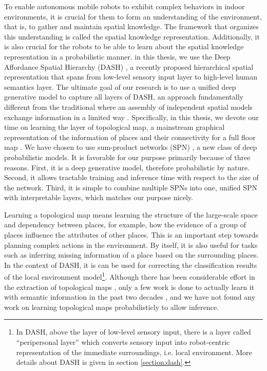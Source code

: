 \documentclass[11pt, titlepage]{article}
\theoremstyle{definition}
\begin{document}
To enable autonomous mobile robots to exhibit complex behaviors in indoor environments, it is crucial for them to form an understanding of the environment, that is, to gather and maintain spatial knowledge. The framework that organizes this understanding is called the spatial knowledge representation. Additionally, it is also crucial for the robots to be able to learn about the spatial knowledge representation in a probabilistic manner. in this thesis, we use the Deep Affordance Spatial Hierarchy (DASH) \cite{pronobis2017deep}, a recently proposed hierarchical spatial representation that spans from low-level sensory input layer to high-level human semantics layer.  The ultimate goal of our research is to use a unified deep generative model to capture all layers of DASH, an approach fundamentally different from the traditional where an assembly of independent spatial models exchange information in a limited way \cite{pronobis2016learning}. 
Specifically, in this thesis, we devote our time on learning the layer of topological map, a mainstream graphical representation of the information of places and their connectivity for a full floor map \cite{remolina2004towards}.  We have chosen to use sum-product networks (SPN) \cite{poon2011sum}, a new class of deep probabilistic models. It is favorable for our purpose primarily because of three reasons. First, it is a deep generative model, therefore probabilistic by nature. Second, it allows tractable training and inference time with respect to the size of the network. Third, it is simple to combine multiple SPNs into one, unified SPN with interpretable layers, which matches our purpose nicely.

Learning a topological map means learning the structure of the large-scale space and dependency between places, for example, how the evidence of a group of places influence the attributes of other places. This is an important step towards planning complex actions in the environment. By itself, it is also useful for tasks such as inferring missing information of a place based on the surrounding places. In the context of DASH, it is can be used for correcting the classification results of the local environment model\footnote{In DASH, above the layer of low-level sensory input, there is a layer called ``peripersonal layer'' which converts sensory input into robot-centric representation of the immediate surroundings, i.e. local environment. More details about DASH is given in section \ref{section:dash}.}. Although there has been considerable effort in the extraction of topological maps \cite{ranganathan2011online}\cite{shi2010online}\cite{tomatis2003hybrid}, only a few work is done to actually learn it with semantic information in the past two decades \cite{aydemir2012can}\cite{mozos2006supervised}, and we have not found any work on learning topological maps probabilisticly to allow inference.
\end{document}
